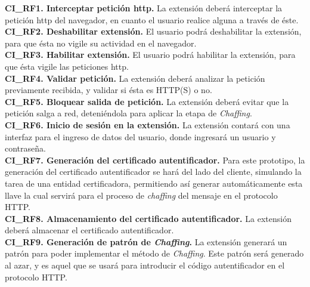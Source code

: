 \documentclass[12pt, a4paper, titlepage]{report}
\begin{document}
				{\setlength{\parindent}{12pt}
				
				\textbf{CI\_RF1. Interceptar petición \acrshort{http}.} La extensión deberá interceptar la petición \acrshort{http} del navegador, en cuanto el usuario realice alguna a través de éste.\\

				\textbf{CI\_RF2. Deshabilitar extensión.} El usuario podrá deshabilitar la extensión, para que ésta no vigile su actividad en el navegador.\\
				
				\textbf{CI\_RF3. Habilitar extensión.} El usuario podrá habilitar la extensión, para que ésta vigile las peticiones \acrshort{http}.\\
				
				\textbf{CI\_RF4. Validar petición.} La extensión deberá analizar la petición previamente recibida, y validar si ésta es HTTP(S) o no.\\
				
				\textbf{CI\_RF5. Bloquear salida de petición.} La extensión deberá evitar que la petición salga a red, deteniéndola para aplicar la etapa de \textit{Chaffing}.\\ 
				
				\textbf{CI\_RF6. Inicio de sesi\'on en la extensi\'on.} La extensi\'on contar\'a con una interfaz para el ingreso de datos del usuario, donde ingresará un usuario y contraseña. \\  
				
                \textbf{CI\_RF7. Generación del certificado autentificador.} Para este prototipo, la generación del certificado autentificador se har\'a del lado del cliente, simulando la tarea de una entidad certificadora, permitiendo as\'i generar automáticamente esta llave la cual servir\'a para el proceso de \textit{chaffing} del mensaje en el protocolo HTTP.\\
                
                \textbf{CI\_RF8. Almacenamiento del certificado autentificador.} La extensi\'on deberá almacenar el certificado autentificador.\\
                
                \textbf{CI\_RF9. Generación de patrón de \textit{Chaffing}.} La extensión generará un patrón para poder implementar el método de \textit{Chaffing}. Este patrón será generado al azar, y es aquel que se usará para introducir el código autentificador en el protocolo HTTP.\\
                
}
\end{document}
